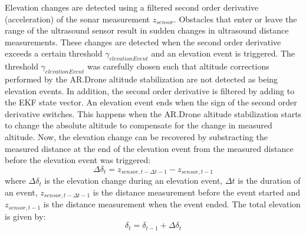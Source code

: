 Elevation changes are detected using a filtered second order derivative (acceleration) of the sonar measurement $z_{sensor}$.
Obstacles that enter or leave the range of the ultrasound sensor result in sudden changes in ultrasound distance measurements.
These changes are detected when the second order derivative exceeds a certain threshold $\gamma_{elevationEvent}$ and an elevation event is triggered.
The threshold $\gamma_{elevationEvent}$ was carefully chosen such that altitude corrections performed by the AR.Drone altitude stabilization are not detected as being elevation events.
In addition, the second order derivative is filtered by adding to the EKF state vector.
An elevation event ends when the sign of the second order derivative switches.
This happens when the AR.Drone altitude stabilization starts to change the absolute altitude to compensate for the change in measured altitude.
Now, the elevation change can be recovered by substracting the measured distance at the end of the elevation event from the measured distance before the elevation event was triggered:
\begin{equation}
\Delta\delta_{t} = z_{sensor, t-\Delta t-1} - z_{sensor, t-1}
\end{equation}
where $\Delta\delta_{t}$ is the elevation change during an elevation event, $\Delta t$ is the duration of an event, $z_{sensor, t-\Delta t-1}$ is the distance measurement before the event started and $z_{sensor, t-1}$ is the distance measurement when the event ended.
The total elevation is given by:
\begin{equation}
\delta_{t} = \delta_{t-1} + \Delta\delta_{t}
\end{equation}


